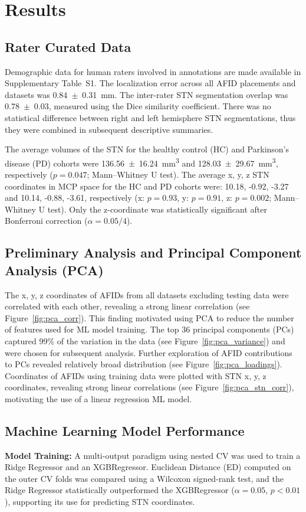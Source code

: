 \section{Results}

\subsection{Rater Curated Data}
Demographic data for human raters involved in annotations are made available in Supplementary Table~S1. The localization error across all AFID placements and datasets was 0.84~$\pm$~0.31~mm. The inter-rater STN segmentation overlap was 0.78~$\pm$~0.03, measured using the Dice similarity coefficient. There was no statistical difference between right and left hemisphere STN segmentations, thus they were combined in subsequent descriptive summaries.

The average volumes of the STN for the healthy control (HC) and Parkinson’s disease (PD) cohorts were 136.56~$\pm$~16.24~mm\textsuperscript{3} and 128.03~$\pm$~29.67~mm\textsuperscript{3}, respectively ($p = 0.047$; Mann–Whitney U test). The average x, y, z STN coordinates in MCP space for the HC and PD cohorts were: 10.18, -0.92, -3.27 and 10.14, -0.88, -3.61, respectively (x: $p = 0.93$, y: $p = 0.91$, z: $p = 0.002$; Mann–Whitney U test). Only the z-coordinate was statistically significant after Bonferroni correction ($\alpha = 0.05/4$).

\subsection{Preliminary Analysis and Principal Component Analysis (PCA)}
The x, y, z coordinates of AFIDs from all datasets excluding testing data were correlated with each other, revealing a strong linear correlation (see Figure~\ref{fig:pca_corr}). This finding motivated using PCA to reduce the number of features used for ML model training. The top 36 principal components (PCs) captured 99\% of the variation in the data (see Figure~\ref{fig:pca_variance}) and were chosen for subsequent analysis. Further exploration of AFID contributions to PCs revealed relatively broad distribution (see Figure~\ref{fig:pca_loadings}). Coordinates of AFIDs using training data were plotted with STN x, y, z coordinates, revealing strong linear correlations (see Figure~\ref{fig:pca_stn_corr}), motivating the use of a linear regression ML model.

\subsection{Machine Learning Model Performance}
\textbf{Model Training:} A multi-output paradigm using nested CV was used to train a Ridge Regressor and an XGBRegressor. Euclidean Distance (ED) computed on the outer CV folds was compared using a Wilcoxon signed-rank test, and the Ridge Regressor statistically outperformed the XGBRegressor ($\alpha = 0.05$, $p < 0.01$), supporting its use for predicting STN coordinates.

